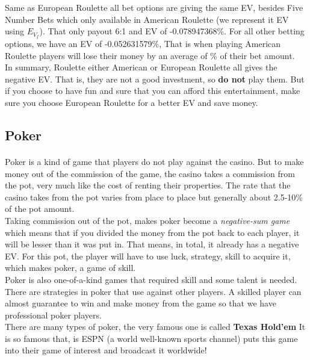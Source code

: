 \documentclass{article}
\begin{document}
Same as European Roulette all bet options are giving the same EV, besides Five Number Bets which only available in American Roulette (we represent it EV using $E_{V_f}$).  That only payout 6:1 and EV of -0.078947368\%.  For all other betting options, we have an EV of -0.052631579\%, That is when playing American Roulette players will lose their money by an average of \% of their bet amount.\\

In summary, Roulette either American or European Roulette all gives the negative EV.  That is, they are not a good investment, so \textbf{do not} play them.  But if you choose to have fun and sure that you can afford this entertainment, make sure you choose European Roulette for a better EV and save money.\\
  

\subsection{Poker}
\paragraph{ }Poker is a kind of game that players do not play against the casino.  But  to make money out of the commission of the game, the casino takes a commission from the pot, very much like the cost of renting their properties.  The rate that the casino takes from the pot varies from place to place but generally about 2.5-10\% of the pot amount. \\

Taking commission out of the pot, makes poker become a \emph{negative-sum game} which means that if you divided the money from the pot back to each player, it will be lesser than it was put in.  That means, in total, it already has a negative EV.  For this pot, the player will have to use luck, strategy, skill to acquire it, which makes poker, a game of skill.\\

Poker is also one-of-a-kind games that required skill and some talent is needed.  There are strategies in poker that use against other players.  A skilled player can almost guarantee to win and make money from the game so that we have professional poker players.\\

There are many types of poker, the very famous one is called \textbf{Texas Hold'em} It is so famous that, is ESPN (a world well-known sports channel) puts this game into their game of interest and broadcast it worldwide!\\
\end{document}
